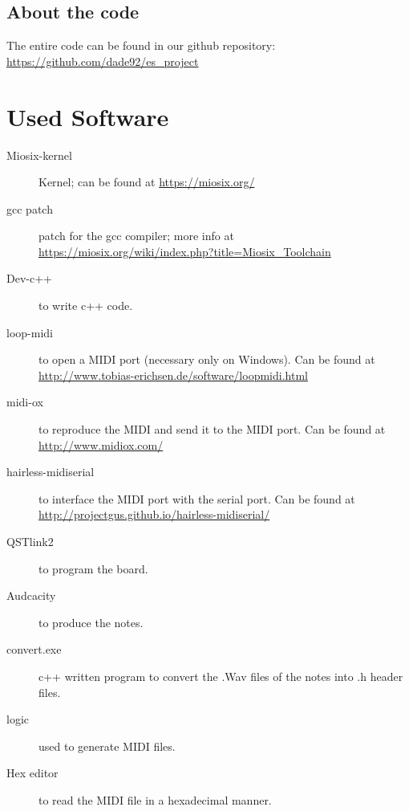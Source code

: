\documentclass[12pt]{article}
\begin{document}
\subsection{About the code}
The entire code can be found in our github repository: \url{https://github.com/dade92/es_project}

\section{Used Software} \label{sec:used}
\begin{description} 
	\item[Miosix-kernel] Kernel; can be found at \url{https://miosix.org/}
	\item[gcc patch] patch for the gcc compiler; more info at \url{https://miosix.org/wiki/index.php?title=Miosix_Toolchain}
	\item[Dev-c++] to write c++  code.
	\item[loop-midi] to open a MIDI port (necessary only on Windows). Can be found at \url{http://www.tobias-erichsen.de/software/loopmidi.html}
	\item[midi-ox] to reproduce the MIDI and send it to the MIDI port. Can be found at \url{http://www.midiox.com/}
	\item[hairless-midiserial] to interface the MIDI port with the serial port. Can be found at \url{http://projectgus.github.io/hairless-midiserial/}
	\item[QSTlink2] to program the board.
	\item[Audcacity] to produce the notes.
	\item[convert.exe] c++ written program to convert the .Wav files  of the notes into .h header files.
	\item[logic] used to generate MIDI files.
	\item[Hex editor] to read the MIDI file in a hexadecimal manner.
\end{description}
\end{document}

